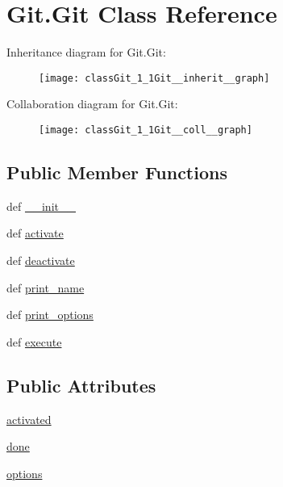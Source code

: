 \hypertarget{classGit_1_1Git}{\section{Git.\-Git Class Reference}
\label{classGit_1_1Git}
}


Inheritance diagram for Git.\-Git\-:\nopagebreak
\begin{figure}[H]
\begin{center}
\leavevmode
\texttt{[image: classGit\_1\_1Git\_\_inherit\_\_graph]}
\end{center}
\end{figure}


Collaboration diagram for Git.\-Git\-:\nopagebreak
\begin{figure}[H]
\begin{center}
\leavevmode
\texttt{[image: classGit\_1\_1Git\_\_coll\_\_graph]}
\end{center}
\end{figure}
\subsection*{Public Member Functions}
\begin{DoxyCompactItemize}
\item 
def \hyperlink{classGit_1_1Git_a19c57b8a20fad72c1090f8a07f6c00c0}{\-\_\-\-\_\-init\-\_\-\-\_\-}
\item 
def \hyperlink{classGit_1_1Git_a199ce28e3b17a99dd87b79b89bda524b}{activate}
\item 
def \hyperlink{classGit_1_1Git_a94824f2a863076683cf96a35bba71d46}{deactivate}
\item 
def \hyperlink{classGit_1_1Git_af7077c1aba1570b613f2f860504f668b}{print\-\_\-name}
\item 
def \hyperlink{classGit_1_1Git_a8f8145b83190e539ac8708f63a3e936b}{print\-\_\-options}
\item 
def \hyperlink{classGit_1_1Git_a6ae531f8f42d85850eda90f02bb184c3}{execute}
\end{DoxyCompactItemize}
\subsection*{Public Attributes}
\begin{DoxyCompactItemize}
\item 
\hyperlink{classGit_1_1Git_a22d3012cb93bad0a9122dd84afdfeee9}{activated}
\item 
\hyperlink{classGit_1_1Git_adb8991008d4bb4568fa9c2f991711cda}{done}
\item 
\hyperlink{classGit_1_1Git_a7560b88b014c5da8785739c7bb6283ed}{options}
\end{DoxyCompactItemize}


